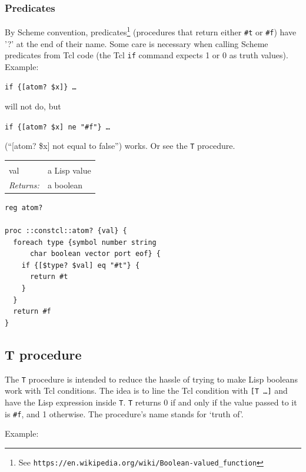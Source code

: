 \documentclass[twoside,9pt]{report}
\begin{document}
\begin{pulledtext}
\subsubsection{Predicates}
\label{predicates}


By Scheme convention, predicates\footnote{See \texttt{https://en.wikipedia.org/wiki/Boolean-valued\_function}} (procedures that return either \texttt{\#t} or \texttt{\#f}) have '?' at the end of their name. Some care is necessary when calling Scheme predicates from Tcl code (the Tcl \texttt{if} command expects 1 or 0 as truth values). Example:


\texttt{if \{[atom? \$x]\} \ldots }


will not do, but


\texttt{if \{[atom? \$x] ne "\#f"\} \ldots }


(``[atom? \$x] not equal to false'') works. Or see the \texttt{T} procedure.

\end{pulledtext}

\noindent\begin{tabular}{ |p{1.9cm} p{8cm}| }
\hline
\rowcolor[HTML]{CCCCCC} \multicolumn{2}{|l|}{\bf atom? (public)} \\
val & a Lisp value \\
\textit{Returns:} & a boolean \\
\hline
\end{tabular}
\begin{lstlisting}
reg atom?

proc ::constcl::atom? {val} {
  foreach type {symbol number string
      char boolean vector port eof} {
    if {[$type? $val] eq "#t"} {
      return #t
    }
  }
  return #f
}
\end{lstlisting}
\subsection{T procedure}
\label{t-procedure}


The \texttt{T} procedure is intended to reduce the hassle of trying to make Lisp booleans work with Tcl conditions. The idea is to line the Tcl condition with \texttt{[T \ldots ]} and have the Lisp expression inside \texttt{T}. \texttt{T} returns 0 if and only if the value passed to it is \texttt{\#f}, and 1 otherwise. The procedure's name stands for `truth of'.


Example:
\end{document}

